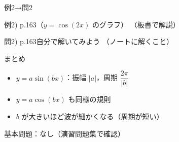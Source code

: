 \documentclass[aspectratio=43,professionalfonts,handout]{beamer}
\begin{document}
\begin{frame}{例2→問2}
  \begin{exampleblock}{例2) p.163（$y = \cos(2x)$ のグラフ）}
    （板書で解説）
  \end{exampleblock}

  \vfill

  \begin{block}{問2) p.163\quad 自分で解いてみよう}
    （ノートに解くこと）
  \end{block}
\end{frame}

\begin{frame}{まとめ}
  \begin{itemize}
    \item $y = a\sin(bx)$：振幅 $|a|$，周期 $\dfrac{2\pi}{|b|}$
    \item $y = a\cos(bx)$ も同様の規則
    \item $b$ が大きいほど波が細かくなる（周期が短い）
  \end{itemize}

  \vfill
  {\small 基本問題：なし（演習問題集で確認）}
\end{frame}
\end{document}
